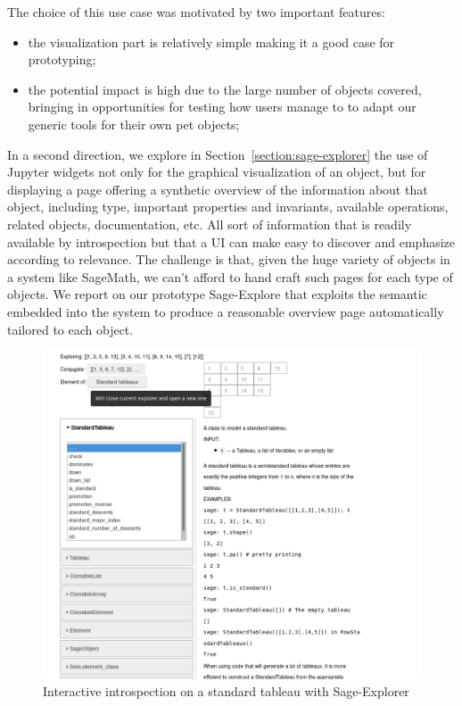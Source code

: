 \documentclass{deliverablereport}
\begin{document}
The choice of this use case was motivated by two important features:
\begin{itemize}
\item the visualization part is relatively simple making it a good
  case for prototyping;
\item the potential impact is high due to the large number of objects
  covered, bringing in opportunities for testing how users manage to
  to adapt our generic tools for their own pet objects;
\end{itemize}

In a second direction, we explore in
Section~\ref{section:sage-explorer} the use of Jupyter widgets not only
for the graphical visualization of an object, but for displaying a
page offering a synthetic overview of the information about that
object, including type, important properties and invariants, available
operations, related objects, documentation, etc. All sort of
information that is readily available by introspection but that a UI
can make easy to discover and emphasize according to relevance. The
challenge is that, given the huge variety of objects in a system like
SageMath, we can't afford to hand craft such pages for each type of
objects. We report on our prototype
Sage-Explore that exploits the semantic embedded into the
system to produce a reasonable overview page automatically tailored to
each object.


\begin{figure}[h]
  \begin{center}
    \includegraphics[width=\textwidth]{images/TableauExplorer}
  \end{center}
  \caption{Interactive introspection on a standard tableau with Sage-Explorer}
  \label{fig:tableau-explorer}
\end{figure}
\end{document}
